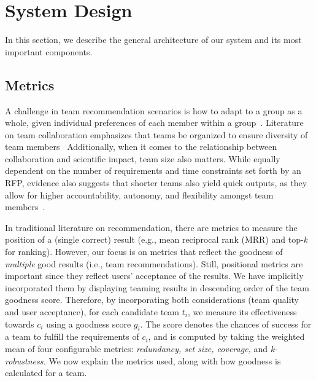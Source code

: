\section{System Design}
In this section, we describe the general architecture of our system and its most important components.

\subsection{Metrics} \label{subsec:metrics}
A challenge in team recommendation scenarios is how to adapt to a group as a whole, given individual preferences of each member within a group~\cite{boratto2010groups}. Literature on team collaboration emphasizes that teams be organized to ensure diversity of team members~\cite{he2022expertise} %
Additionally, when it comes to the relationship between collaboration and scientific impact, team size also matters. %
While equally dependent on the number of requirements and time constraints set forth by an RFP, evidence also suggests that shorter teams also yield quick outputs, %
as they allow for higher accountability, autonomy, and flexibility amongst team members~\cite{trope2023small}. 

In traditional literature on recommendation, there are  metrics to measure the position of a (single correct) result (e.g., mean reciprocal rank (MRR) and top-\textit{k} for ranking). However, our focus is on metrics that reflect the goodness of \textit{multiple} good results (i.e., team recommendations). Still, positional metrics are important since they  reflect users’ acceptance of the results. We have implicitly incorporated them by displaying teaming results in descending order of the team goodness score. Therefore, by incorporating both considerations (team quality and user acceptance), for each candidate team $t_i$, we measure its effectiveness towards $c_i$ using a goodness score $g_i$. The score denotes the chances of success for a team to fulfill the requirements of $c_i$, and is computed by taking the weighted mean of four configurable metrics: \textit{redundancy, set size, coverage,} and \textit{k-robustness.} We now explain the metrics used, along with how goodness is calculated for a team.

